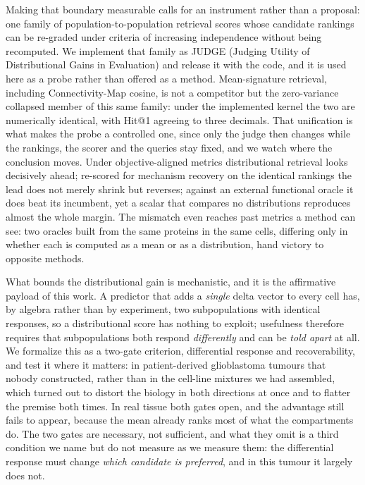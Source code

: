 \documentclass[11pt,letterpaper]{article}
\begin{document}
Making that boundary measurable calls for an instrument rather than a proposal: one family of population-to-population retrieval scores whose candidate rankings can be re-graded under criteria of increasing independence without being recomputed. We implement that family as JUDGE (Judging Utility of Distributional Gains in Evaluation) and release it with the code, and it is used here as a probe rather than offered as a method. Mean-signature retrieval, including Connectivity-Map cosine, is not a competitor but the zero-variance collapsed member of this same family: under the implemented kernel the two are numerically identical, with Hit@1 agreeing to three decimals. That unification is what makes the probe a controlled one, since only the judge then changes while the rankings, the scorer and the queries stay fixed, and we watch where the conclusion moves. Under objective-aligned metrics distributional retrieval looks decisively ahead; re-scored for mechanism recovery on the identical rankings the lead does not merely shrink but reverses; against an external functional oracle it does beat its incumbent, yet a scalar that compares no distributions reproduces almost the whole margin. The mismatch even reaches past metrics a method can see: two oracles built from the same proteins in the same cells, differing only in whether each is computed as a mean or as a distribution, hand victory to opposite methods.

What bounds the distributional gain is mechanistic, and it is the affirmative payload of this work. A predictor that adds a \emph{single} delta vector to every cell has, by algebra rather than by experiment, two subpopulations with identical responses, so a distributional score has nothing to exploit; usefulness therefore requires that subpopulations both respond \emph{differently} and can be \emph{told apart} at all. We formalize this as a two-gate criterion, differential response and recoverability, and test it where it matters: in patient-derived glioblastoma tumours that nobody constructed, rather than in the cell-line mixtures we had assembled, which turned out to distort the biology in both directions at once and to flatter the premise both times. In real tissue both gates open, and the advantage still fails to appear, because the mean already ranks most of what the compartments do. The two gates are necessary, not sufficient, and what they omit is a third condition we name but do not measure as we measure them: the differential response must change \emph{which candidate is preferred}, and in this tumour it largely does not.
\end{document}
